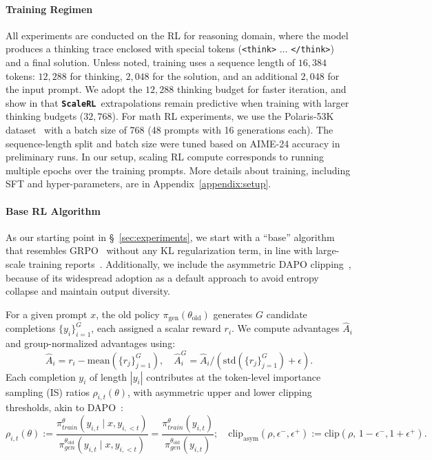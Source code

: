 \documentclass[]{fairmeta} %
\newcommand{\scalerl}{\texttt{\textbf{ScaleRL}}}
\begin{document}
\paragraph{Training Regimen}
All experiments are conducted on the RL for reasoning domain, where the model produces a thinking trace enclosed with special tokens (\texttt{<think>} $\ldots$ \texttt{</think>}) and a final solution. Unless noted, training uses a sequence length of $16,384$ tokens: $12,288$ for thinking, $2,048$ for the solution, and an additional $2,048$ for the input prompt. We adopt the $12,288$ thinking budget for faster iteration, and show in  that \scalerl\ extrapolations remain predictive when training with larger thinking budgets ($32,768$). For math RL experiments, we use the Polaris-53K dataset~\citep{polaris2025} with a batch size of 768 (48 prompts with 16 generations each). The sequence-length split and batch size were tuned based on AIME-24 accuracy in preliminary runs. %
In our setup, scaling RL compute corresponds to running multiple epochs over the training prompts. More details about training, including SFT and hyper-parameters, are in Appendix~\ref{appendix:setup}.


\paragraph{Base RL Algorithm}
As our starting point in \S~\ref{sec:experiments}, we start with a ``base'' algorithm that resembles GRPO~\citep{shao2024deepseekmath} without any KL regularization term, in line with large-scale training reports~\citep{rastogi2025magistral,minimax_m1}. Additionally, we include the asymmetric DAPO clipping~\citep{yu2025dapo}, because of its widespread adoption as a default approach to avoid entropy collapse and maintain output diversity. 

For a given prompt $x$, the old policy $\pi_{\text{gen}}(\theta_{\text{old}})$ generates $G$ candidate completions $\{y_i\}_{i=1}^G$, each assigned a scalar reward $r_i$. 
We compute advantages $\hat{A}_i$ and group-normalized advantages using:
\begin{equation*}
    \hat{A}_i = r_i - \mathrm{mean}(\{r_j\}_{j=1}^G),  \quad
    \hat{A}_i^{G} = \hat{A}_i/(\mathrm{std}(\{r_j\}_{j=1}^G) + \epsilon).
\end{equation*}
Each completion $y_i$ of length $|y_i|$ contributes at the token-level importance sampling (IS) ratios $\rho_{i,t}(\theta)$, with asymmetric upper and lower clipping thresholds, akin to DAPO~\citep{yu2025dapo}:
\begin{equation}
    \rho_{i,t}(\theta) := \frac{\pi^\theta_{train}(y_{i,t} \mid x, y_{i,<t})}{\pi^{\theta_{\text{old}}}_{gen}(y_{i,t} \mid x, y_{i,<t})} = \frac{\pi^\theta_{train}(y_{i,t})}{\pi^{\theta_{\text{old}}}_{gen}(y_{i,t})}; \quad \mathrm{clip}_{\mathrm{asym}}(\rho, \epsilon^-, \epsilon^+) := \mathrm{clip}(\rho,\, 1-\epsilon^-, 1+\epsilon^+).
    \label{eq:is}
\end{equation}
\end{document}
